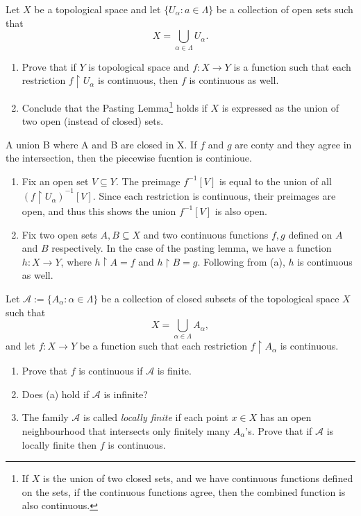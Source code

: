 \documentclass[../../main.tex]{subfiles}
\begin{document}
\begin{problem}[2]
Let $X$ be a topological space and let $\{ U_\alpha : a \in \Lambda \}$ be a collection of open sets such that
\[
	X = \bigcup_{\alpha \in \Lambda} U_\alpha.
\]
\begin{enumerate}[label=(\alph*)]
	\item Prove that if $Y$ is topological space and $f: X \to Y$ is a function such that each restriction $f\upharpoonright U_\alpha$ is continuous, then $f$ is continuous as well.
	\item Conclude that the Pasting Lemma\footnote{If $X$ is the union of two closed sets, and we have continuous functions defined on the sets, if the continuous functions agree, then the combined function is also continuous.}
	      holds if $X$ is expressed as the union of two open (instead of closed) sets.
\end{enumerate}
\end{problem}
A union B where A and B are closed in X.
If $f$ and $g$ are conty and they agree in the intersection, then the piecewise fucntion is continioue.
\begin{enumerate}[label=(\alph*)]
	\item Fix an open set $V \subseteq Y$.
	      The preimage $f^{-1}[V]$ is equal to the union of all $(f\upharpoonright U_\alpha)^{-1}[V]$.
	      Since each restriction is continuous, their preimages are open, and thus this shows the union $f^{-1}[V]$ is also open.
	\item Fix two open sets $A, B \subseteq X$ and two continuous functions $f, g$ defined on $A$ and $B$ respectively.
	      In the case of the pasting lemma, we have a function $h : X \to Y$, where $h\upharpoonright A = f$ and $h\upharpoonright B = g$.
	      Following from (a), $h$ is continuous as well.
\end{enumerate}

\begin{problem}[3, Munkres \S18 Ex.9]
Let $\mathscr{A} := \{ A_\alpha : \alpha \in \Lambda \}$ be a collection of closed subsets of the topological space $X$ such that
\[
	X= \bigcup_{\alpha \in \Lambda} A_\alpha,
\]
and let $f : X \to Y$ be a function such that each restriction $f\upharpoonright A_\alpha$ is continuous.
\begin{enumerate}[label=(\alph*)]
	\item Prove that $f$ is continuous if $\mathscr{A}$ is finite.
	\item Does (a) hold if $\mathscr{A}$ is infinite?
	\item The family $\mathscr{A}$ is called \emph{locally finite} if each point $x \in X$ has an open neighbourhood that intersects only finitely many $A_\alpha$'s.
	      Prove that if $\mathscr{A}$ is locally finite then $f$ is continuous.
\end{enumerate}
\end{problem}
\end{document}
